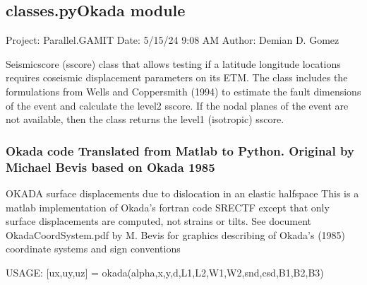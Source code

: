 \documentclass[letterpaper,10pt,english]{sphinxmanual}
\begin{document}
\subsection{classes.pyOkada module}
\label{\detokenize{classes:module-classes.pyOkada}}\label{\detokenize{classes:classes-pyokada-module}}
\sphinxAtStartPar
Project: Parallel.GAMIT
Date: 5/15/24 9:08 AM
Author: Demian D. Gomez

\sphinxAtStartPar
Seismic\sphinxhyphen{}score (s\sphinxhyphen{}score) class that allows testing if a latitude longitude locations requires co\sphinxhyphen{}seismic
displacement parameters on its ETM. The class includes the formulations from Wells and Coppersmith (1994) to
estimate the fault dimensions of the event and calculate the level\sphinxhyphen{}2 s\sphinxhyphen{}score. If the nodal planes of the event
are not available, then the class returns the level\sphinxhyphen{}1 (isotropic) s\sphinxhyphen{}score.


\subsubsection{Okada code Translated from Matlab to Python. Original by Michael Bevis based on Okada 1985}
\label{\detokenize{classes:okada-code-translated-from-matlab-to-python-original-by-michael-bevis-based-on-okada-1985}}
\sphinxAtStartPar
OKADA surface displacements due to dislocation in an elastic half\sphinxhyphen{}space This is a matlab implementation of Okada’s
fortran code SRECTF except that only surface displacements are computed, not strains or tilts. See document
OkadaCoordSystem.pdf by M. Bevis for graphics describing of Okada’s (1985) coordinate systems and sign conventions

\sphinxAtStartPar
USAGE:    {[}ux,uy,uz{]} = okada(alpha,x,y,d,L1,L2,W1,W2,snd,csd,B1,B2,B3)
\end{document}

